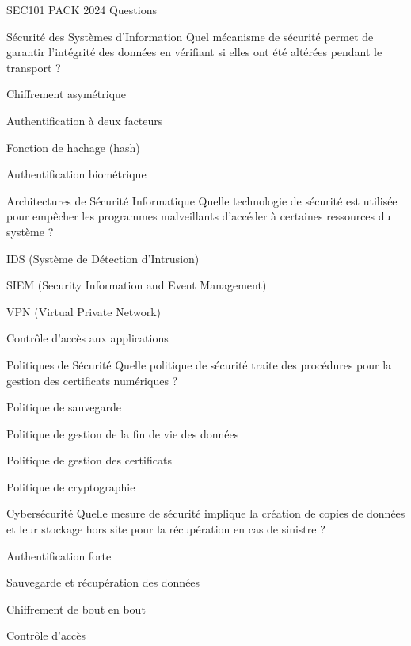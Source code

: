\documentclass[12pt]{article}
\begin{document}
\begin{quiz}{SEC101 PACK 2024 Questions}
  \begin{multi}[points=1]{Sécurité des Systèmes d'Information}
    Quel mécanisme de sécurité permet de garantir l'intégrité des données en vérifiant si elles ont été altérées pendant le transport ?
    \item Chiffrement asymétrique
    \item Authentification à deux facteurs
    \item* Fonction de hachage (hash)
    \item Authentification biométrique
  \end{multi}

  \begin{multi}[points=1]{Architectures de Sécurité Informatique}
    Quelle technologie de sécurité est utilisée pour empêcher les programmes malveillants d'accéder à certaines ressources du système ?
    \item IDS (Système de Détection d'Intrusion)
    \item SIEM (Security Information and Event Management)
    \item VPN (Virtual Private Network)
    \item* Contrôle d'accès aux applications
  \end{multi}

  \begin{multi}[points=1]{Politiques de Sécurité}
    Quelle politique de sécurité traite des procédures pour la gestion des certificats numériques ?
    \item Politique de sauvegarde
    \item Politique de gestion de la fin de vie des données
    \item* Politique de gestion des certificats
    \item Politique de cryptographie
  \end{multi}

  \begin{multi}[points=1]{Cybersécurité}
    Quelle mesure de sécurité implique la création de copies de données et leur stockage hors site pour la récupération en cas de sinistre ?
    \item Authentification forte
    \item* Sauvegarde et récupération des données
    \item Chiffrement de bout en bout
    \item Contrôle d'accès
  \end{multi}


\end{quiz}
\end{document}
